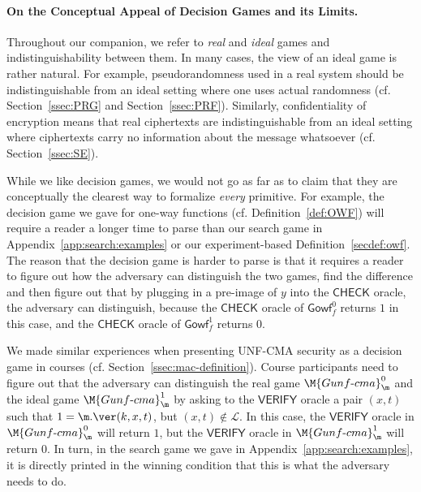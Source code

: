 \paragraph{On the Conceptual Appeal of Decision Games and its Limits.} Throughout our companion, we refer to \emph{real} and \emph{ideal} games and indistinguishability between them. In many cases, the view of an ideal game is rather natural. For example, pseudorandomness used in a real system should be indistinguishable from an ideal setting where one uses actual randomness (cf. Section~\ref{ssec:PRG} and Section~\ref{ssec:PRF}). Similarly, confidentiality of encryption means that real ciphertexts are indistinguishable from an ideal setting where ciphertexts carry no information about the message whatsoever (cf. Section~\ref{ssec:SE}).

While we like decision games, we would not go as far as to claim that they are conceptually the clearest way to formalize \emph{every} primitive. For example, the decision game we gave for one-way functions (cf. Definition~\ref{def:OWF}) will require a reader a longer time to parse than our search game in Appendix~\ref{app:search:examples} or our experiment-based Definition~\ref{secdef:owf}. The reason that the decision game is harder to parse is that it requires a reader to figure out how the adversary can distinguish the two games, find the difference and then figure out that by plugging in a pre-image of $y$ into the $\mathsf{CHECK}$ oracle, the adversary can distinguish, because the $\mathsf{CHECK}$ oracle of $\textsf{Gowf}_f^0$ returns $1$ in this case, and the $\mathsf{CHECK}$ oracle of $\textsf{Gowf}_f^1$ returns $0$.

We made similar experiences when presenting UNF-CMA security as a decision game in courses (cf. Section~\ref{ssec:mac-definition}). Course participants need to figure out that the adversary can distinguish the real game $\M{Gunf\text{-}cma}^0_\m$ and the ideal game $\M{Gunf\text{-}cma}^1_\m$ by asking to
the $\mathsf{VERIFY}$ oracle a pair $(x,t)$ such that $1=\m.\ver(k,x,t)$, but $(x,t)\notin\mathcal{L}$. In this case, the $\mathsf{VERIFY}$ oracle in $\M{Gunf\text{-}cma}^0_\m$ will return $1$, but the $\mathsf{VERIFY}$ oracle in $\M{Gunf\text{-}cma}^1_\m$ will return $0$. In turn, in the search game we gave in Appendix~\ref{app:search:examples}, it is directly printed in the winning condition that this is what the adversary needs to do.

